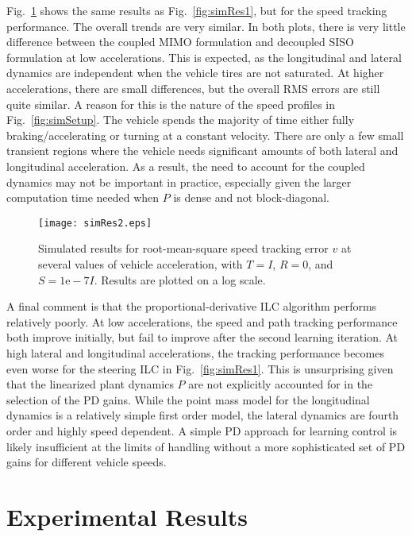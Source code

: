 Fig.~\ref{fig:simRes2} shows the same results as Fig.~\ref{fig:simRes1}, but for the speed tracking performance. 
The overall trends are very similar. In both plots, there is very little difference between the coupled MIMO formulation and decoupled SISO 
formulation at low accelerations. This is expected, as the longitudinal and lateral dynamics are independent when the vehicle tires are not saturated.
At higher accelerations, there are small differences, but the overall RMS errors are still quite similar. A reason for this is the
nature of the speed profiles in Fig.~\ref{fig:simSetup}. The vehicle spends the majority of time either fully braking/accelerating or
turning at a constant velocity. There are only a few small transient regions where the vehicle needs significant amounts of both 
lateral and longitudinal acceleration. As a result, the need to account for the coupled dynamics may not be important in practice, especially
given the larger computation time needed when $P$ is dense and not block-diagonal.     

\begin{figure}[tb]
\centering
\texttt{[image: simRes2.eps]}
\caption[Simulated results for root-mean-square speed tracking error $v$ at several values of vehicle acceleration.]{Simulated results for root-mean-square speed tracking error $v$ at several values of vehicle acceleration, with $T = I$, $R = 0$, and $S = \mathrm{1e-7} I$.
Results are plotted on a log scale.}
\label{fig:simRes2}
\end{figure}

A final comment is that the proportional-derivative ILC algorithm performs relatively poorly. At low accelerations, the
speed and path tracking performance both improve initially, but fail to improve after the second learning iteration. At high
lateral and longitudinal accelerations, the tracking performance becomes even worse for the steering ILC in Fig.~\ref{fig:simRes1}.  
This is unsurprising given that the linearized plant dynamics $P$ are not explicitly accounted for in the selection of the PD gains. 
While the point mass model for the longitudinal dynamics is a relatively simple first order model, the lateral dynamics 
are fourth order and highly speed dependent. A simple PD approach for learning control is likely insufficient at the limits of handling
without a more sophisticated set of PD gains for different vehicle speeds.

\section{Experimental Results}
\label{sec:ch4ExpRes}

